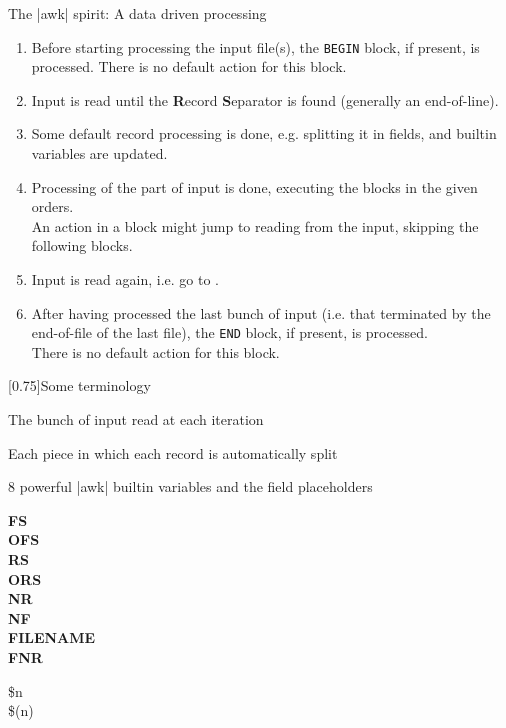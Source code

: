 \begin{frame}{The \bash|awk| spirit: A data driven processing}
    \vspace{-3mm}
    \begin{enumerate}
        \item Before starting processing the input file(s), the \texttt{BEGIN} block, if present, is processed.
              There is no default action for this block.
        \item Input is read until the \textbf{R}ecord \textbf{S}eparator is found (generally an end-of-line).
        \item Some default record processing is done, e.g. splitting it in fields, and builtin variables are updated.
        \item Processing of the part of input is done, executing the blocks in the given orders.\\
              An action in a block might jump to reading from the input, skipping the following blocks.
        \item Input is read again, i.e. go to .
        \item After having processed the last bunch of input (i.e. that terminated by the end-of-file of the last file), the \texttt{END} block, if present, is processed.\\
              There is no default action for this block.
    \end{enumerate}
    \begin{varblock}{}[0.75\textwidth]{Some terminology}
        \begin{description}
            \item[\textbf{Record:}] The bunch of input read at each iteration
            \item[\textbf{Field:}] Each piece in which each record is automatically split
        \end{description}
    \end{varblock}
\end{frame}
\begin{frame}{8 powerful \bash|awk| builtin variables and the field placeholders}
    \begin{description}
        \item[\textbf{FS}]
        \item[\textbf{OFS}]
        \item[\textbf{RS}]
        \item[\textbf{ORS}]
        \item[\textbf{NR}]
        \item[\textbf{NF}]
        \item[\textbf{FILENAME}]
        \item[\textbf{FNR}]
    \end{description}
    \begin{description}
        \item[\$n] 
        \item[\$(n)]
    \end{description}
\end{frame}
